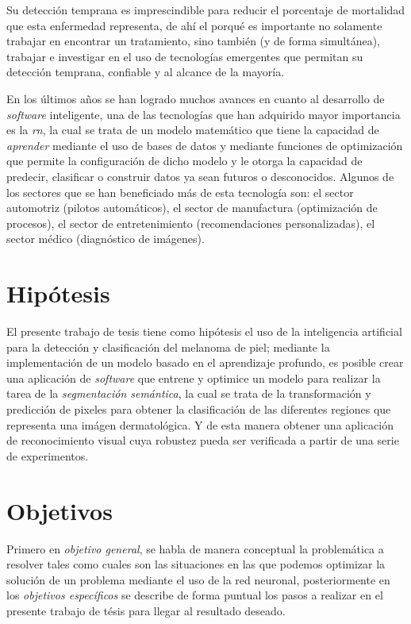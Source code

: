  Su detección temprana es imprescindible para reducir el porcentaje de mortalidad que esta enfermedad representa, de ahí el porqué es importante no solamente trabajar en encontrar un tratamiento, sino también (y de forma simultánea), trabajar e investigar en el uso de tecnologías emergentes que permitan su detección temprana, confiable y al alcance de la mayoría.

En los últimos años se han logrado muchos avances en cuanto al desarrollo de \emph{software} inteligente, una de las tecnologías que han adquirido mayor importancia es la \emph{\gls{rn}}, la cual se trata de un modelo matemático que tiene la capacidad de \emph{aprender} mediante el uso de bases de datos y mediante funciones de optimización que permite la configuración de dicho modelo y le otorga la capacidad de predecir, clasificar o construir datos ya sean futuros o desconocidos. Algunos de los sectores que se han beneficiado más de esta tecnología son: el sector automotriz (pilotos automáticos), el sector de manufactura (optimización de procesos), el sector de entretenimiento (recomendaciones personalizadas), el sector médico (diagnóstico de imágenes). 


\section{Hipótesis}
El presente trabajo de tesis tiene como hipótesis el uso de la inteligencia artificial para la detección y clasificación del melanoma de piel; mediante la implementación de un modelo basado en el aprendizaje profundo, es posible crear una aplicación de \emph{software} que entrene y optimice un modelo para realizar la tarea de la \emph{segmentación semántica}, la cual se trata de la transformación y predicción de pixeles para obtener la clasificación de las diferentes regiones que representa una imágen dermatológica. Y de esta manera obtener una aplicación de reconocimiento visual cuya robustez pueda ser verificada a partir de una serie de experimentos.



\section{Objetivos}
Primero en \emph{objetivo general}, se habla de manera conceptual la problemática a resolver tales como cuales son las situaciones en las que podemos optimizar la solución de un problema mediante el uso de la red neuronal, posteriormente en los \emph{objetivos específicos} se describe de forma puntual los pasos a realizar en el presente trabajo de tésis para llegar al resultado deseado.

